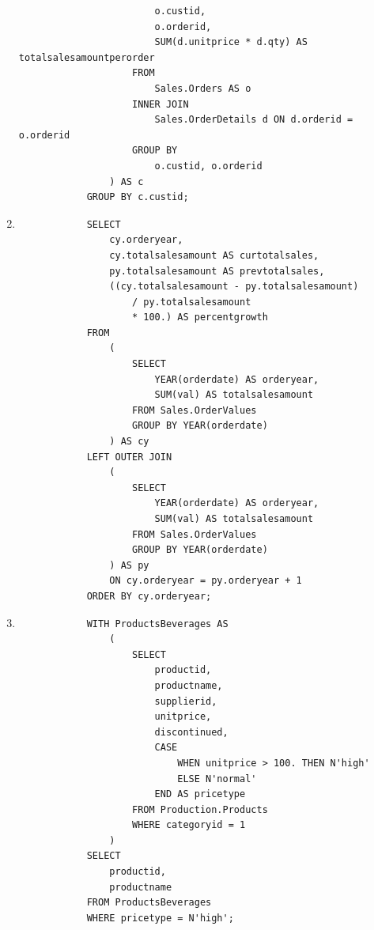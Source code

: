 \documentclass[12pt,titlepage]{article}
\begin{document}
\begin{enumerate}
{\begin{verbatim}
                        o.custid,
                        o.orderid,
                        SUM(d.unitprice * d.qty) AS totalsalesamountperorder
                    FROM
                        Sales.Orders AS o
                    INNER JOIN
                        Sales.OrderDetails d ON d.orderid = o.orderid
                    GROUP BY
                        o.custid, o.orderid
                ) AS c
            GROUP BY c.custid;
        \end{verbatim}
    }
    \pagebreak
    \item {
        \begin{verbatim}
            SELECT
                cy.orderyear,
                cy.totalsalesamount AS curtotalsales,
                py.totalsalesamount AS prevtotalsales,
                ((cy.totalsalesamount - py.totalsalesamount) 
                    / py.totalsalesamount 
                    * 100.) AS percentgrowth
            FROM
                (
                    SELECT
                        YEAR(orderdate) AS orderyear,
                        SUM(val) AS totalsalesamount
                    FROM Sales.OrderValues
                    GROUP BY YEAR(orderdate)
                ) AS cy
            LEFT OUTER JOIN
                (
                    SELECT
                        YEAR(orderdate) AS orderyear,
                        SUM(val) AS totalsalesamount
                    FROM Sales.OrderValues
                    GROUP BY YEAR(orderdate)
                ) AS py
                ON cy.orderyear = py.orderyear + 1
            ORDER BY cy.orderyear;
        \end{verbatim}
    }
    \item {
        \begin{verbatim}
            WITH ProductsBeverages AS
                (
                    SELECT
                        productid,
                        productname,
                        supplierid,
                        unitprice,
                        discontinued,
                        CASE
                            WHEN unitprice > 100. THEN N'high'
                            ELSE N'normal'
                        END AS pricetype
                    FROM Production.Products
                    WHERE categoryid = 1
                )
            SELECT
                productid,
                productname
            FROM ProductsBeverages
            WHERE pricetype = N'high';
        \end{verbatim}
}
\end{enumerate}
\end{document}
